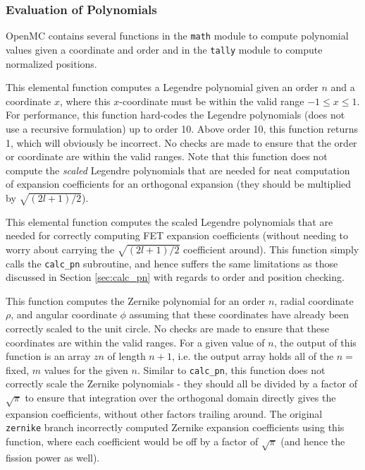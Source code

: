 \documentclass[10pt]{article}
\newcounter{subsubsubsection}[subsubsection]
\numberwithin{equation}{section} %
\begin{document}
\subsubsection{Evaluation of Polynomials}
OpenMC contains several functions in the {\tt math} module to compute polynomial values given a coordinate and order and in the {\tt tally} module to compute normalized positions.

\label{sec:calc_pn}
This elemental function computes a Legendre polynomial given an order \(n\) and a coordinate \(x\), where this \(x\)-coordinate must be within the valid range \(-1\leq x\leq1\). For performance, this function hard-codes the Legendre polynomials (does not use a recursive formulation) up to order 10. Above order 10, this function returns 1, which will obviously be incorrect. No checks are made to ensure that the order or coordinate are within the valid ranges. Note that this function does not compute the {\it scaled} Legendre polynomials that are needed for neat computation of expansion coefficients for an orthogonal expansion (they should be multiplied by \(\sqrt{(2l+1)/2}\)). 

This elemental function computes the scaled Legendre polynomials that are needed for correctly computing FET expansion coefficients (without needing to worry about carrying the \(\sqrt{(2l+1)/2}\) coefficient around). This function simply calls the {\tt calc\_pn} subroutine, and hence suffers the same limitations as those discussed in Section \ref{sec:calc_pn} with regards to order and position checking. 

\label{sec:calc_zn}
This function computes the Zernike polynomial for an order \(n\), radial coordinate \(\rho\), and angular coordinate \(\phi\) assuming that these coordinates have already been correctly scaled to the unit circle. No checks are made to ensure that these coordinates are within the valid ranges. For a given value of \(n\), the output of this function is an array \(zn\) of length \(n+1\), i.e. the output array holds all of the \(n=\) fixed, \(m\) values for the given \(n\). Similar to {\tt calc\_pn}, this function does not correctly scale the Zernike polynomials - they should all be divided by a factor of \(\sqrt{\pi}\) to ensure that integration over the orthogonal domain directly gives the expansion coefficients, without other factors trailing around. The original {\tt zernike} branch incorrectly computed Zernike expansion coefficients using this function, where each coefficient would be off by a factor of \(\sqrt{\pi}\) (and hence the fission power as well).
\end{document}
